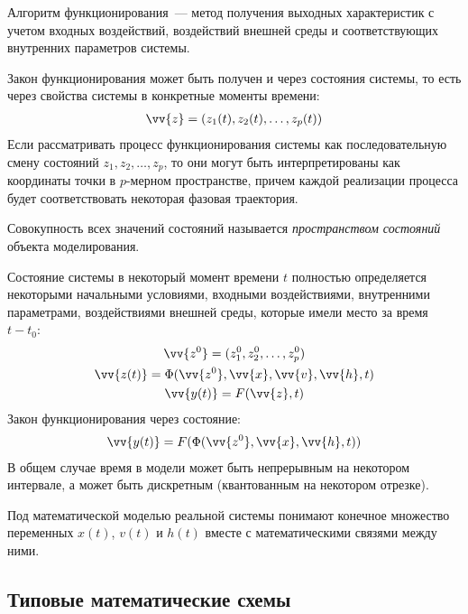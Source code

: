 \begin{dd}
    Алгоритм функционирования~--- метод получения выходных характеристик с учетом входных воздействий, воздействий внешней среды и соответствующих внутренних параметров системы.
\end{dd}

Закон функционирования может быть получен и через состояния системы, то есть через свойства системы в конкретные моменты времени:
%
\begin{gather*}
    \vv{z} = (z_1(t), z_2(t), \dots, z_p(t))
\end{gather*}
%
Если рассматривать процесс функционирования системы как последовательную смену состояний $z_1, z_2, \dots, z_p$, то они могут быть интерпретированы как координаты точки в $p$-мерном пространстве, причем каждой реализации процесса будет соответствовать некоторая фазовая траектория.

\begin{dd}
    Совокупность всех значений состояний называется \textit{пространством состояний} объекта моделирования.
\end{dd}

Состояние системы в некоторый момент времени $t$ полностью определяется некоторыми начальными условиями, входными воздействиями, внутренними параметрами, воздействиями внешней среды, которые имели место за время $t - t_0$:
%
\begin{gather*}
    \vv{z^0} = (z_1^0, z_2^0, \dots, z_p^0)\\
    \vv{z(t)} = \Phi(\vv{z^0}, \vv{x}, \vv{v}, \vv{h}, t)\\
    \vv{y(t)} = F(\vv{z}, t)
\end{gather*}
%
Закон функционирования через состояние:
%
\begin{gather*}
    \vv{y(t)} = F(\Phi(\vv{z^0}, \vv{x}, \vv{h}, t))
\end{gather*}
%
В общем случае время в модели может быть непрерывным на некотором интервале, а может быть дискретным (квантованным на некотором отрезке).

\begin{dd}
    Под математической моделью реальной системы понимают конечное множество переменных $x(t)$, $v(t)$ и $h(t)$ вместе с математическими связями между ними.
\end{dd}

\subsection{Типовые математические схемы}

